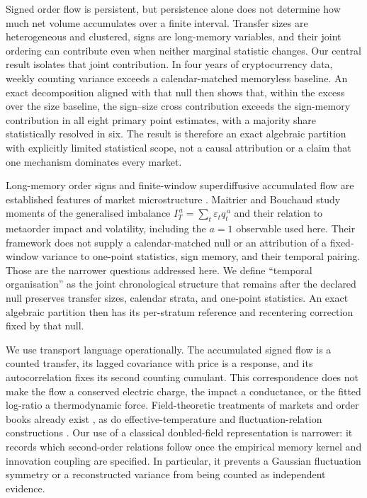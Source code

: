 \documentclass[aps,pre,twocolumn,superscriptaddress,floatfix,nofootinbib]{revtex4-2}
\newcommand{\eps}{\varepsilon}
\begin{document}
Signed order flow is persistent, but persistence alone does not determine how
much net volume accumulates over a finite interval. Transfer sizes are
heterogeneous and clustered, signs are long-memory variables, and their joint
ordering can contribute even when neither marginal statistic changes. Our
central result isolates that joint contribution. In four years of
cryptocurrency data, weekly counting variance exceeds a calendar-matched
memoryless baseline. An exact decomposition aligned with that null then shows
that, within the excess over the size baseline, the sign--size cross
contribution exceeds the sign-memory contribution in all eight primary point
estimates, with a majority share statistically resolved in six. The result is
therefore an exact algebraic partition with explicitly limited statistical
scope, not a causal attribution or a claim that one mechanism dominates every
market.

Long-memory order signs and finite-window superdiffusive accumulated flow are established
features of market microstructure \cite{lillo2004,lillo2005,sato2023prl,
sato2023prr}. Maitrier and Bouchaud \cite{maitrier2026} study moments of the
generalised imbalance $I_T^{\,a}=\sum_t\eps_t q_t^{\,a}$ and their relation to
metaorder impact and volatility, including the $a=1$ observable used here.
Their framework does not supply a calendar-matched null or an attribution of a
fixed-window variance to one-point statistics, sign memory, and their temporal
pairing. Those are the narrower questions addressed here. We define ``temporal
organisation'' as the joint chronological structure that remains after the
declared null preserves transfer sizes, calendar strata, and one-point
statistics. An exact algebraic partition then has its per-stratum reference and
recentering correction fixed by that null.

We use transport language operationally. The accumulated signed flow is a
counted transfer, its lagged covariance with price is a response, and its
autocorrelation fixes its second counting cumulant. This correspondence does
not make the flow a conserved electric charge, the impact a conductance, or
the fitted log-ratio a thermodynamic force. Field-theoretic treatments of
markets and order books already exist \cite{rosaclot1999,shi2021}, as do
effective-temperature and fluctuation-relation constructions
\cite{yura2014,ramezani2025,li2024entropy,gao2026,maskawa2025}. Our use of a
classical doubled-field representation is narrower: it records which
second-order relations follow once the empirical memory kernel and innovation
coupling are specified. In particular, it prevents a Gaussian fluctuation
symmetry or a reconstructed variance from being counted as independent
evidence.
\end{document}
